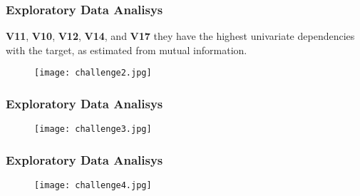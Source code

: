 \documentclass[11pt]{beamer}
\begin{document}
\begin{frame}[fragile]
  \frametitle{\normalsize{\textbf{
    Exploratory Data Analisys
  }}} 

  \vspace{0.15cm}

  \scriptsize{  

    \textbullet \: \textbf{V11}, \textbf{V10}, \textbf{V12}, \textbf{V14}, 
    and \textbf{V17} they have the highest univariate dependencies with the 
    target, as estimated from mutual information.

    \begin{figure}[h!]
      \centering
      \texttt{[image: challenge2.jpg]}
    \end{figure}
  }
\end{frame}

\begin{frame}[fragile]
  \frametitle{\normalsize{\textbf{
    Exploratory Data Analisys
  }}} 

  \vspace{0.15cm}

  \scriptsize{  

    \begin{figure}[h!]
      \centering
      \texttt{[image: challenge3.jpg]}
    \end{figure}
  }
\end{frame}

\begin{frame}[fragile]
  \frametitle{\normalsize{\textbf{
    Exploratory Data Analisys
  }}} 

  \vspace{0.15cm}

  \scriptsize{  

    \begin{figure}[h!]
      \centering
      \texttt{[image: challenge4.jpg]}
    \end{figure}
  }
\end{frame}
\end{document}
